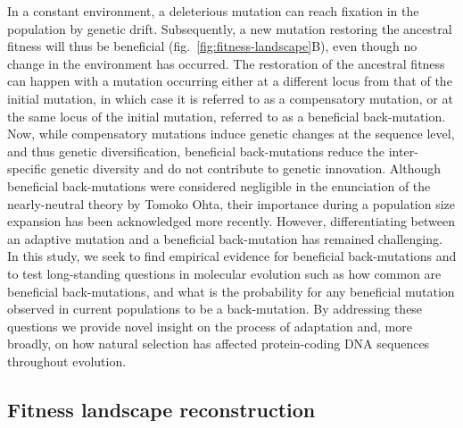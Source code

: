 \documentclass{article}
\begin{document}
    In a constant environment, a deleterious mutation can reach fixation in the population by genetic drift\cite{Ohta1992}.
    Subsequently, a new mutation restoring the ancestral fitness will thus be beneficial (fig.~\ref{fig:fitness-landscape}B), even though no change in the environment has occurred\cite{hartl_compensatory_1996, sella_application_2005, mustonen_fitness_2009, cvijovic_fate_2015}.
    The restoration of the ancestral fitness can happen with a mutation occurring either at a different locus from that of the initial mutation, in which case it is referred to as a compensatory mutation\cite{hartl_compensatory_1996, mustonen_fitness_2009}, or at the same locus of the initial mutation, referred to as a beneficial back-mutation\cite{piganeau_estimating_2003, charlesworth_other_2007}.
    Now, while compensatory mutations induce genetic changes at the sequence level, and thus genetic diversification, beneficial back-mutations reduce the inter-specific genetic diversity and do not contribute to genetic innovation.
    Although beneficial back-mutations were considered negligible in the enunciation of the nearly-neutral theory by Tomoko Ohta\cite{Ohta1992}, their importance during a population size expansion has been acknowledged more recently\cite{charlesworth_other_2007}.
    However, differentiating between an adaptive mutation and a beneficial back-mutation has remained challenging\cite{chi_detecting_2020}.
    In this study, we seek to find empirical evidence for beneficial back-mutations and to test long-standing questions in molecular evolution such as how common are beneficial back-mutations, and
    what is the probability for any beneficial mutation observed in current populations to be a back-mutation.
    By addressing these questions we provide novel insight on the process of adaptation and, more broadly, on how natural selection has affected protein-coding DNA sequences throughout evolution.

    \subsection*{Fitness landscape reconstruction}
\end{document}
